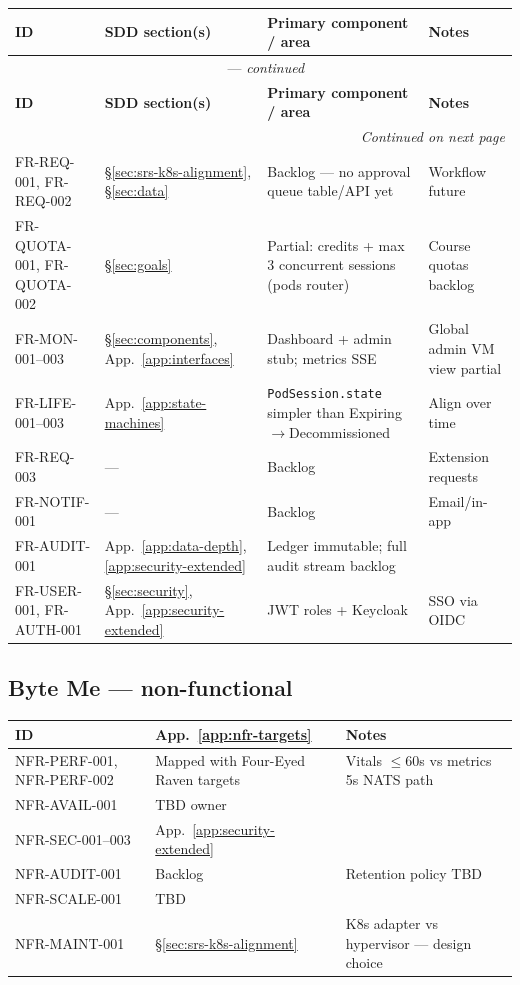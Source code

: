\documentclass[12pt,a4paper]{article}
\newcommand{\ByteMeHeading}{Byte Me}
\newcommand{\ByteMe}{%
  \texorpdfstring{\textbf{\ByteMeHeading}}{Byte Me}%
}
\begin{document}
{\small
\begin{longtable}{@{}p{2.4cm} p{2.8cm} p{4cm} p{5cm}@{}}
  \toprule
  \textbf{ID} & \textbf{SDD section(s)} & \textbf{Primary component / area} & \textbf{Notes} \\
  \midrule
  \endfirsthead
  \multicolumn{4}{c}{\tablename\ \thetable{} --- \textit{continued}} \\
  \toprule
  \textbf{ID} & \textbf{SDD section(s)} & \textbf{Primary component / area} & \textbf{Notes} \\
  \midrule
  \endhead
  \midrule
  \multicolumn{4}{r}{\textit{Continued on next page}} \\
  \endfoot
  \bottomrule
  \endlastfoot
  FR-REQ-001, FR-REQ-002 & \S\ref{sec:srs-k8s-alignment}, \S\ref{sec:data} & Backlog --- no approval queue table/API yet & Workflow future \\
  FR-QUOTA-001, FR-QUOTA-002 & \S\ref{sec:goals} & Partial: credits + max 3 concurrent sessions (pods router) & Course quotas backlog \\
  FR-MON-001--003 & \S\ref{sec:components}, App.~\ref{app:interfaces} & Dashboard + admin stub; metrics SSE & Global admin VM view partial \\
  FR-LIFE-001--003 & App.~\ref{app:state-machines} & \texttt{PodSession.state} simpler than Expiring$\rightarrow$Decommissioned & Align over time \\
  FR-REQ-003 & --- & Backlog & Extension requests \\
  FR-NOTIF-001 & --- & Backlog & Email/in-app \\
  FR-AUDIT-001 & App.~\ref{app:data-depth}, \ref{app:security-extended} & Ledger immutable; full audit stream backlog & \\
  FR-USER-001, FR-AUTH-001 & \S\ref{sec:security}, App.~\ref{app:security-extended} & JWT roles + Keycloak & SSO via OIDC \\
\end{longtable}
}

\subsection{\ByteMe{} --- non-functional}
\begin{tabularx}{\textwidth}{@{}p{3cm} p{3cm} X@{}}
  \toprule
  \textbf{ID} & \textbf{App.~\ref{app:nfr-targets}} & \textbf{Notes} \\
  \midrule
  NFR-PERF-001, NFR-PERF-002 & Mapped with Four-Eyed Raven targets & Vitals $\leq$60s vs metrics 5s NATS path \\
  NFR-AVAIL-001 & TBD owner & \\
  NFR-SEC-001--003 & App.~\ref{app:security-extended} & \\
  NFR-AUDIT-001 & Backlog & Retention policy TBD \\
  NFR-SCALE-001 & TBD & \\
  NFR-MAINT-001 & \S\ref{sec:srs-k8s-alignment} & K8s adapter vs hypervisor --- design choice \\
  \bottomrule
\end{tabularx}
\end{document}
